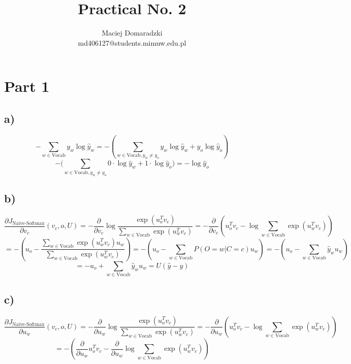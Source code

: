 \documentclass[12pt]{article}
\begin{document}
 
 
\title{Practical No. 2 }%
\author{Maciej Domaradzki\\ %
md406127@students.mimuw.edu.pl}
 
\maketitle
 
\section{Part 1 }
\subsection*{a) }

\[
-\sum_{w \in \text{Vocab}} y_w \log{\hat{y}_w} = 
- (\sum_{w \in \text{Vocab}, y_w \neq y_o} y_w \log{\hat{y}_w} + y_o \log{\hat{y}_o})
\]
\[
- (\sum_{w \in \text{Vocab}, y_w \neq y_o} 0 \cdot \log{\hat{y}_w} + 1 \cdot \log{\hat{y}_o)
= - \log{\hat{y}_o}}
\]

\subsection*{b) }

\[
\frac{\partial J_{\text{Naive-Softmax}}}{\partial v_c} (v_c, o, U)
= - \frac{\partial}{\partial v_c} \log{\frac{ \exp (u_o^T v_c)}{\sum_{w \in \text{Vocab}}  \exp (u_w^T v_c)}}
= - \frac{\partial}{\partial v_c} (u_o^T v_c - \log{\sum_{w \in \text{Vocab}}  \exp (u_w^T v_c)})
\]
\[
= - (u_o  - \frac{\sum_{w \in \text{Vocab}} \exp (u_w^T v_c)  u_w}{\sum_{w \in \text{Vocab}}  \exp (u_w^T v_c)})
= - (u_o  - \sum_{w \in \text{Vocab}} P(O=w|C=c) u_w)
= - (u_o  - \sum_{w \in \text{Vocab}} \hat{y}_w u_w)
\]
\[
= - u_o + \sum_{w \in \text{Vocab}} \hat{y}_w u_w
= U(\hat{y} - y)
\]

\subsection*{c) }

\[
\frac{\partial J_{\text{Naive-Softmax}}}{\partial u_w} (v_c, o, U)
= - \frac{\partial}{\partial u_w} \log{\frac{ \exp (u_o^T v_c)}{\sum_{w \in \text{Vocab}}  \exp (u_w^T v_c)}}
= - \frac{\partial}{\partial u_w} (u_o^T v_c - \log{\sum_{w \in \text{Vocab}}  \exp (u_w^T v_c)})
\]
\[
= - (\frac{\partial}{\partial u_w}  u_o^T v_c - \frac{\partial}{\partial u_w} \log{\sum_{w \in \text{Vocab}}  \exp (u_w^T v_c)})
\]
\end{document}
